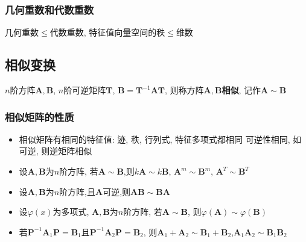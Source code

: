 \documentclass{article}
\begin{document}
			\subsubsection{几何重数和代数重数}
				几何重数$\leqslant$代数重数, 特征值向量空间的秩$\leqslant$维数
		\subsection{相似变换}
			$n$阶方阵$\boldsymbol A,\boldsymbol B$, $n$阶可逆矩阵$\boldsymbol T$, $\boldsymbol B=\boldsymbol T^{-1}\boldsymbol A\boldsymbol T$, 则称方阵$\boldsymbol A,\boldsymbol B$\textbf{相似}, 记作$\boldsymbol A\sim \boldsymbol B$
			\subsubsection{相似矩阵的性质}
				\begin{itemize}
					\item 相似矩阵有相同的特征值:
					 \subitem 迹, 秩, 行列式, 特征多项式都相同
					 \subitem 可逆性相同, 如可逆, 则逆矩阵相似
					\item 设$\boldsymbol A,\boldsymbol B$为$n$阶方阵, 若$\boldsymbol A\sim \boldsymbol B$,则$k\boldsymbol A\sim k\boldsymbol B$, $\boldsymbol A^m\sim \boldsymbol B^m$, $\boldsymbol A^T\sim \boldsymbol B^T$
					\item 设$\boldsymbol A,\boldsymbol B$为$n$阶方阵,且$\boldsymbol A$可逆,则$\boldsymbol A\boldsymbol B\sim \boldsymbol B\boldsymbol A$
					\item 设$\varphi (x)$为多项式, $\boldsymbol A,\boldsymbol B$为$n$阶方阵, 若$\boldsymbol A\sim \boldsymbol B$, 则$\varphi (\boldsymbol A)\sim \varphi (\boldsymbol B)$
					\item 若$\boldsymbol P^{-1}\boldsymbol A_1\boldsymbol P=\boldsymbol B_1$且$\boldsymbol P^{-1}\boldsymbol A_2\boldsymbol P=\boldsymbol B_2$, 则$\boldsymbol A_1+\boldsymbol A_2\sim \boldsymbol B_1+\boldsymbol B_2$,$\boldsymbol A_1\boldsymbol A_2\sim \boldsymbol B_1\boldsymbol B_2$
				\end{itemize}
\end{document}
